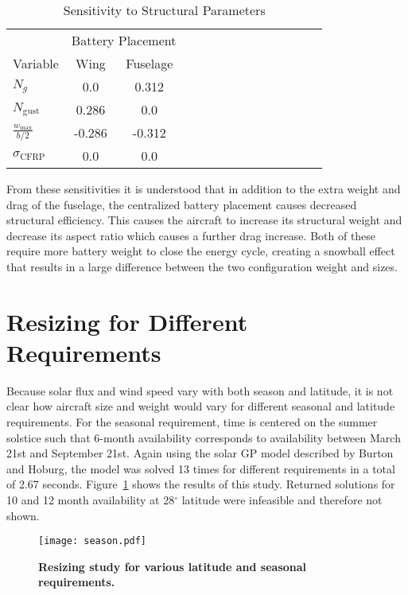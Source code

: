\documentclass[]{aiaa-tc}%
\begin{document}
\begin{longtable}{lccccccccccccc}
    \caption{Sensitivity to Structural Parameters}\\
    \toprule
    \toprule
    \label{t:fusesens}
                                    & \multicolumn{2}{c}{Battery Placement} \\
    Variable                        & Wing    &  Fuselage   \\ \hline
    $N_g$                           & 0.0     & 0.312       \\
    $N_{\mathrm{gust}}$             & 0.286   & 0.0         \\
    $\frac{w_{\text{max}}}{b/2}$    &  -0.286 & -0.312      \\
    $\sigma_{\mathrm{CFRP}}$        & 0.0     & 0.0         \\
    \bottomrule
\end{longtable}

From these sensitivities it is understood that in addition to the extra weight and drag of the fuselage, the centralized battery placement causes decreased structural efficiency. 
This causes the aircraft to increase its structural weight and decrease its aspect ratio which causes a further drag increase.  
Both of these require more battery weight to close the energy cycle, creating a snowball effect that results in a large difference between the two configuration weight and sizes. 

\section{Resizing for Different Requirements}

Because solar flux and wind speed vary with both season and latitude, it is not clear how aircraft size and weight would vary for different seasonal and latitude requirements.  
For the seasonal requirement, time is centered on the summer solstice such that 6-month availability corresponds to availability between March 21st and September 21st. 
Again using the solar GP model described by Burton and Hoburg, the model was solved 13 times for different requirements in a total of 2.67 seconds.  
Figure~\ref{f:season} shows the results of this study. 
Returned solutions for 10 and 12 month availability at 28$^{\circ}$ latitude were infeasible and therefore not shown.  

\begin{figure}[h!]
	\begin{center}
	\texttt{[image: season.pdf]}
    \caption{\textbf{Resizing study for various latitude and seasonal requirements.}}
	\label{f:season}
	\end{center}
\end{figure}
\end{document}
